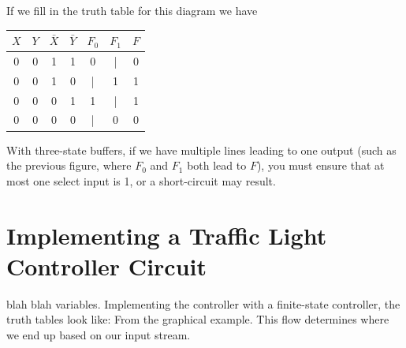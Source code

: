 \documentclass{report}
\begin{document}
If we fill in the truth table for this diagram we have
\begin{center}
\begin{tabular}{ c c | c c | c c | c }
$X$ & $Y$ & $\bar{X}$ & $\bar{Y}$ & $F_0$ & $F_1$ & $F$ \\ \hline
0 & 0 & 1 & 1 & 0 & | & 0 \\
0 & 0 & 1 & 0 & | & 1 & 1 \\
0 & 0 & 0 & 1 & 1 & | & 1 \\
0 & 0 & 0 & 0 & | & 0 & 0 \\
\end{tabular}
\end{center}
With three-state buffers, if we have multiple lines leading to one output (such as the previous figure, where $F_0$ and $F_1$ both lead to $F$), you must ensure that at most one select input is 1, or a short-circuit may result.
\section{Implementing a Traffic Light Controller Circuit}
blah blah variables. Implementing the controller with a finite-state controller, the truth tables look like:
From the graphical example. This flow determines where we end up based on our input stream. 
\end{document}
